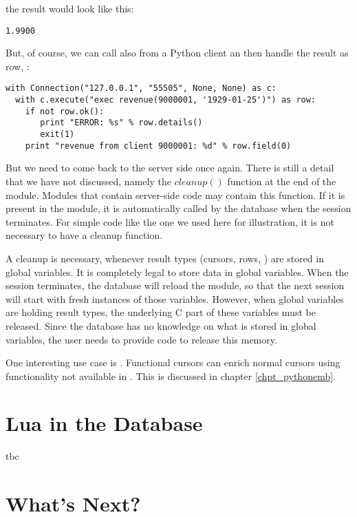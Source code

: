 
the result would look like this:

\begin{verbatim}
1.9900
\end{verbatim}

But, of course, we can call 
also from a Python client an then handle
the result as row, \eg:

\begin{python}
\begin{lstlisting}
with Connection("127.0.0.1", "55505", None, None) as c:
  with c.execute("exec revenue(9000001, '1929-01-25')") as row:
    if not row.ok():
       print "ERROR: %s" % row.details()
       exit(1)
    print "revenue from client 9000001: %d" % row.field(0)
\end{lstlisting}
\end{python}

But we need to come back to the server side once again.
There is still a detail that we have not discussed,
namely the $cleanup()$ function at the end of the module.
Modules that contain server-side code may contain this
function. If it is present in the module, it is automatically
called by the database when the session terminates.
For simple code like the one we used
here for illustration, it is not necessary to have a cleanup
function. 

A cleanup is necessary, whenever result types
(cursors, rows, \etc) are stored in global variables.
It is completely legal to store data in global variables.
When the session terminates, the database will reload
the module, so that the next session will start with
fresh instances of those variables. However, when
global variables are holding result types, the underlying
C part of these variables must be released.
Since the database has no knowledge on what is stored
in global variables, the user needs to provide code
to release this memory.

One interesting use case is .
Functional cursors can enrich normal cursors
using functionality
not available in \sql.
This is discussed in chapter \ref{chpt_pythonemb}.

\section{Lua in the Database}
tbc

\section{What's Next?}
